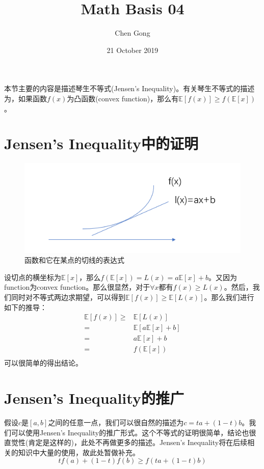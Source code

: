 \documentclass[a4paper]{article}
\title{Math Basis 04}
\author{Chen Gong}
\date{21 October 2019}
\begin{document}
\maketitle
本节主要的内容是描述琴生不等式(Jensen's Inequality)。有关琴生不等式的描述为，如果函数$f(x)$为凸函数(convex function)，那么有$\mathbb{E}[f(x)]\geq f(\mathbb{E}[x])$。

\section{Jensen's Inequality中的证明}
\begin{figure}[H]
    \centering
    \includegraphics[width=.5\textwidth]{微信图片_20191021084621.png}
    \caption{函数和它在某点的切线的表达式}
    \label{fig:my_label_1}
\end{figure}

设切点的横坐标为$\mathbb{E}[x]$，那么$f(\mathbb{E}[x])=L(x)=a\mathbb{E}[x]+b$。又因为function为convex function。那么很显然，对于$\forall x$都有$f(x)\geq L(x)$。然后，我们同时对不等式两边求期望，可以得到$\mathbb{E}[f(x)]\geq \mathbb{E}[L(x)]$。那么我们进行如下的推导：
\begin{equation}
    \begin{split}
        \mathbb{E}[f(x)]\geq & \mathbb{E}[L(x)] \\
        = & \mathbb{E}[a\mathbb{E}[x]+b] \\
        = & a\mathbb{E}[x] + b \\
        = & f(\mathbb{E}[x]) \\
    \end{split}
\end{equation}
可以很简单的得出结论。

\section{Jensen's Inequality的推广}
假设$c$是$[a,b]$之间的任意一点，我们可以很自然的描述为$c=ta+(1-t)b$。我们可以使用Jensen's Inequality的推广形式。这个不等式的证明很简单，结论也很直觉性(肯定是这样的)，此处不再做更多的描述。Jensen's Inequality将在后续相关的知识中大量的使用，故此处暂做补充。
\begin{equation}
    tf(a)+(1-t)f(b)\geq f(ta+(1-t)b)
\end{equation}
\end{document}
